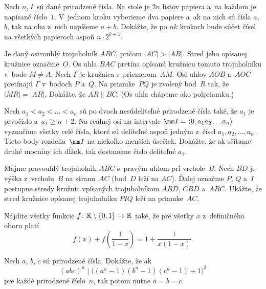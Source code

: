 {%
Nech $n$, $k$ sú dané prirodzené čísla. Na stole je $2n$ listov papiera a~na každom je napísané číslo~$1$. V~jednom kroku vyberieme dva papiere a~ak na nich sú čísla $a$, $b$, tak na oba z~nich napíšeme $a + b$. Dokážte, že po $nk$ krokoch bude súčet čísel na všetkých papieroch aspoň $n\cdot2^{k+1}$.}

{%
Je daný ostrouhlý trojuholník $ABC$, pričom $|AC|>|AB|$. Stred jeho opísanej kružnice označme~$O$. Os uhla $BAC$ pretína opísanú kružnicu tomuto trojuholníku v~bode $M\ne A$. Nech $\Gamma$ je kružnica s~priemerom~$AM$. Osi uhlov $AOB$ a~$AOC$ pretínajú $\Gamma$ v~bodoch $P$ a~$Q$. Na priamke~$PQ$ je zvolený bod~$R$ tak, že $|MR| = |AR|$.
Dokážte, že $AR\parallel BC$. (Os uhla chápeme ako polpriamku.)}

{%
Nech $a_1<a_2<\dots <a_n$ sú po dvoch nesúdeliteľné prirodzené čísla také, že $a_1$ je prvočíslo a~$a_1\ge n+2$. Na reálnej osi na intervale $\mm I=\langle0,a_1a_2\dots a_n\rangle$ vyznačíme všetky celé čísla, ktoré sú deliteľné aspoň jedným z~čísel $a_1,a_2,\dots, a_n$. Tieto body rozdelia~$\mm I$ na niekoľko menších úsečiek. Dokážte, že ak sčítame druhé mocniny ich dĺžok, tak dostaneme číslo deliteľné $a_1$.}

{%
Majme pravouhlý trojuholník $ABC$ s~pravým uhlom pri vrchole~$B$. Nech $BD$ je výška z~vrcholu~$B$ na stranu~$AC$ (bod~$D$ leží na $AC$). Ďalej označme $P$, $Q$ a~$I$ postupne stredy kružníc vpísaných trojuholníkom $ABD$, $CBD$ a~$ABC$. Ukážte, že stred kružnice opísanej trojuholníku $PIQ$ leží na priamke~$AC$.}

{%
Nájdite všetky funkcie $f\colon\Bbb{R}\setminus\{0,1\} \to \Bbb{R}$ také, že pre všetky $x$ z~definičného oboru platí
$$
f(x)+f\left(\frac{1}{1-x}\right) = 1+\frac{1}{x(1-x)}.
$$
}

{%
Nech $a$, $b$, $c$ sú prirodzené čísla. Dokážte, že ak
$$
(abc)^n \mid \bigl((a^n-1)(b^n-1)(c^n-1)+1\bigr)^3
$$
pre každé prirodzené číslo~$n$, tak potom nutne $a=b=c$.}

